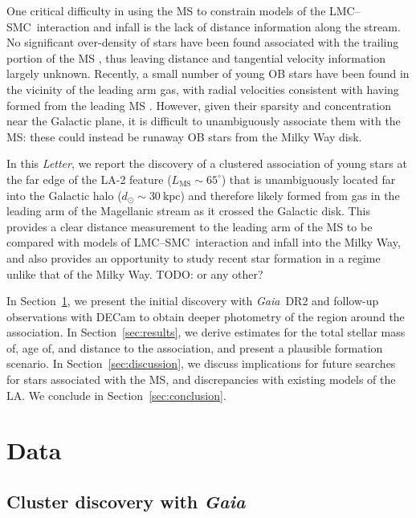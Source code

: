 \documentclass[modern]{aastex62}
\newcommand{\acronym}[1]{{\small{#1}}}
\newcommand{\gaia}{\textsl{Gaia}}
\newcommand{\DR}[1]{\acronym{DR#1}}
\newcommand{\todo}[1]{{\color{red} TODO: #1}}
\newcommand{\articlename}{\textsl{Letter}}
\newcommand{\sectionname}{Section}
\newcommand{\lmcsmc}{LMC--SMC}
\begin{document}
One critical difficulty in using the MS to constrain models of the \lmcsmc\ interaction and infall is the lack of distance information along the stream.
No significant over-density of stars have been found associated with the trailing portion of the MS \citep{Guhathakurta:1998}, thus leaving distance and tangential velocity information largely unknown.
Recently, a small number of young OB stars have been found in the vicinity of the leading arm gas, with radial velocities consistent with having formed from the leading MS \citep{Casetti-Dinescu:2014, Zhang:2017}.
However, given their sparsity and concentration near the Galactic plane, it is difficult to unambiguously associate them with the MS: these could instead be runaway OB stars from the Milky Way disk.

In this \articlename, we report the discovery of a clustered association of young stars at the far edge of the LA-2 feature ($L_{\textrm{MS}} \sim 65^\circ$) that is unambiguously located far into the Galactic halo ($d_\odot \sim 30~\textrm{kpc}$) and therefore likely formed from gas in the leading arm of the Magellanic stream as it crossed the Galactic disk.
This provides a clear distance measurement to the leading arm of the MS to be compared with models of \lmcsmc\ interaction and infall into the Milky Way, and also provides an opportunity to study recent star formation in a regime unlike that of the Milky Way. \todo{or any other?}

In \sectionname~\ref{sec:data}, we present the initial discovery with \gaia\ \DR{2} and follow-up observations with DECam to obtain deeper photometry of the region around the association.
In \sectionname~\ref{sec:results}, we derive estimates for the total stellar mass of, age of, and distance to the association, and present a plausible formation scenario.
In \sectionname~\ref{sec:discussion}, we discuss implications for future searches for stars associated with the MS, and discrepancies with existing models of the LA.
We conclude in \sectionname~\ref{sec:conclusion}.


\section{Data} \label{sec:data}

\subsection{Cluster discovery with \gaia}
\label{sec:discovery}
\end{document}
